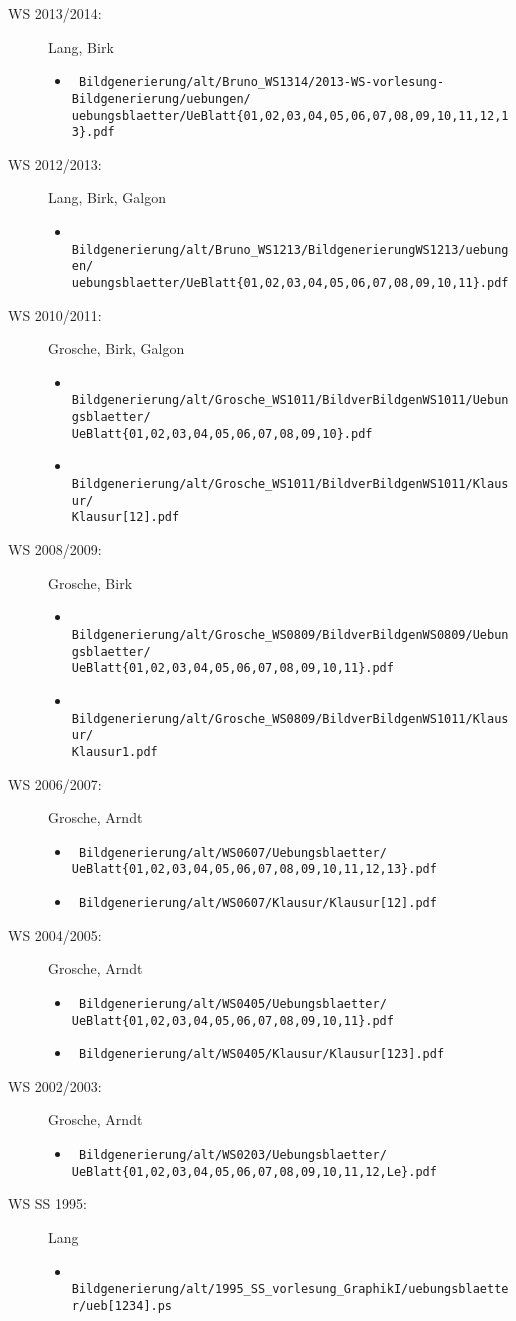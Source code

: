 \documentclass[a4paper,12pt]{scrartcl}
\newcommand{\WSSS}{WS}
\newenvironment{topic}{%
  \setboolean{indatelist}{false}
  \begin{description}}{%
  \ifthenelse{\boolean{indatelist}}{\end{itemize}}{}
  \end{description}}
\newcommand{\pdfpath}[3]{%
  \item[\WSSS{} #1:] #2
  \begin{itemize}
    \item \texttt{#3}
  \end{itemize}}
\newcommand{\pdfpaths}[4]{%
  \item[\WSSS{} #1:] #2
  \begin{itemize}
    \item \texttt{#3}
    \item \texttt{#4}
  \end{itemize}}
\begin{document}
\begin{topic}
  \pdfpath{2013/2014}{Lang, Birk}{%
    Bildgenerierung/alt/Bruno\_WS1314/2013-WS-vorlesung-Bildgenerierung/uebungen/\\
    \hspace*{1cm} uebungsblaetter/UeBlatt\{01,02,03,04,05,06,07,08,09,10,11,12,13\}.pdf}

  \pdfpath{2012/2013}{Lang, Birk, Galgon}{%
    Bildgenerierung/alt/Bruno\_WS1213/BildgenerierungWS1213/uebungen/\\
    \hspace*{1cm} uebungsblaetter/UeBlatt\{01,02,03,04,05,06,07,08,09,10,11\}.pdf}

  \pdfpaths{2010/2011}{Grosche, Birk, Galgon}{%
    Bildgenerierung/alt/Grosche\_WS1011/BildverBildgenWS1011/Uebungsblaetter/\\
    \hspace*{1cm} UeBlatt\{01,02,03,04,05,06,07,08,09,10\}.pdf}{%
    Bildgenerierung/alt/Grosche\_WS1011/BildverBildgenWS1011/Klausur/\\
    \hspace*{1cm} Klausur[12].pdf}

  \pdfpaths{2008/2009}{Grosche, Birk}{%
    Bildgenerierung/alt/Grosche\_WS0809/BildverBildgenWS0809/Uebungsblaetter/\\
    \hspace*{1cm} UeBlatt\{01,02,03,04,05,06,07,08,09,10,11\}.pdf}{%
    Bildgenerierung/alt/Grosche\_WS0809/BildverBildgenWS1011/Klausur/\\
    \hspace*{1cm} Klausur1.pdf}

  \pdfpaths{2006/2007}{Grosche, Arndt}{%
    Bildgenerierung/alt/WS0607/Uebungsblaetter/\\
    \hspace*{1cm} UeBlatt\{01,02,03,04,05,06,07,08,09,10,11,12,13\}.pdf}{%
    Bildgenerierung/alt/WS0607/Klausur/Klausur[12].pdf}

  \pdfpaths{2004/2005}{Grosche, Arndt}{%
    Bildgenerierung/alt/WS0405/Uebungsblaetter/\\
    \hspace*{1cm} UeBlatt\{01,02,03,04,05,06,07,08,09,10,11\}.pdf}{%
    Bildgenerierung/alt/WS0405/Klausur/Klausur[123].pdf}

  \pdfpath{2002/2003}{Grosche, Arndt}{%
    Bildgenerierung/alt/WS0203/Uebungsblaetter/\\
    \hspace*{1cm} UeBlatt\{01,02,03,04,05,06,07,08,09,10,11,12,Le\}.pdf}

  \pdfpath{SS 1995}{Lang}{%
    Bildgenerierung/alt/1995\_SS\_vorlesung\_GraphikI/uebungsblaetter/ueb[1234].ps}
\end{topic}
 
\end{document}
